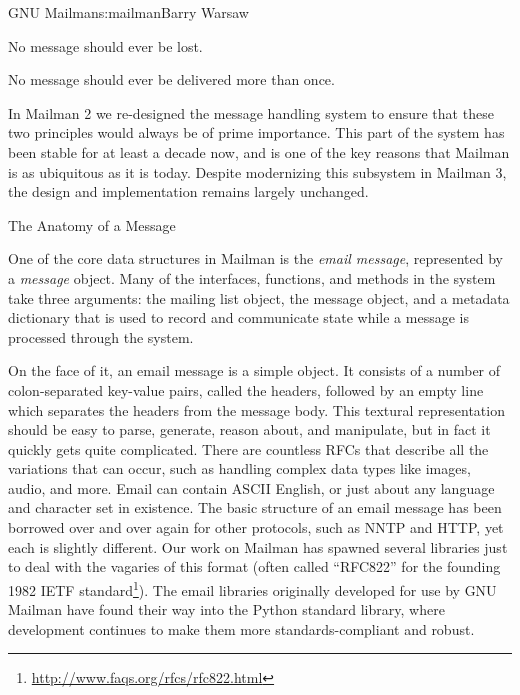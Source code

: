 \begin{aosachapter}{GNU Mailman}{s:mailman}{Barry Warsaw}
\begin{aosaitemize}

\item No message should ever be lost.

\item No message should ever be delivered more than once.

\end{aosaitemize}

In Mailman 2 we re-designed the message handling system to ensure that
these two principles would always be of prime importance.  This part
of the system has been stable for at least a decade now, and is one of
the key reasons that Mailman is as ubiquitous as it is today.  Despite
modernizing this subsystem in Mailman 3, the design and implementation
remains largely unchanged.

\begin{aosasect1}{The Anatomy of a Message}

One of the core data structures in Mailman is the \emph{email
  message}, represented by a \emph{message} object.  Many of the
interfaces, functions, and methods in the system take three arguments:
the mailing list object, the message object, and a metadata dictionary
that is used to record and communicate state while a message is
processed through the system.


On the face of it, an email message is a simple object.  It consists
of a number of colon-separated key-value pairs, called the headers,
followed by an empty line which separates the headers from the message
body.  This textural representation should be easy to parse, generate,
reason about, and manipulate, but in fact it quickly gets quite
complicated.  There are countless RFCs that describe all the
variations that can occur, such as handling complex data types like
images, audio, and more.  Email can contain ASCII English, or just
about any language and character set in existence.  The basic
structure of an email message has been borrowed over and over again
for other protocols, such as NNTP and HTTP, yet each is slightly
different.  Our work on Mailman has spawned several libraries just to
deal with the vagaries of this format (often called ``RFC822'' for the
founding 1982 IETF
standard\footnote{\url{http://www.faqs.org/rfcs/rfc822.html}}).  The
email libraries originally developed for use by GNU Mailman have found
their way into the Python standard library, where development
continues to make them more standards-compliant and robust.


\end{aosasect1}
\end{aosachapter}
